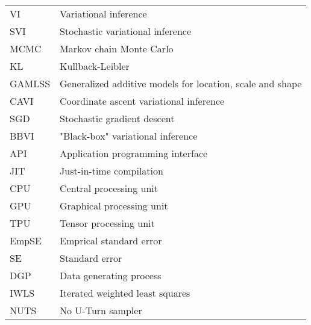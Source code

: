 \begin{tabular}{@{} l @{\hskip 1in} l}
  VI & Variational inference \\
  SVI & Stochastic variational inference \\
  MCMC & Markov chain Monte Carlo \\
  KL & Kullback-Leibler \\
  GAMLSS & Generalized additive models for location, scale and shape \\
  CAVI & Coordinate ascent variational inference \\
  SGD & Stochastic gradient descent \\
  BBVI & "Black-box" variational inference \\
  API & Application programming interface \\
  JIT & Just-in-time compilation \\
  CPU & Central processing unit \\
  GPU & Graphical processing unit \\
  TPU & Tensor processing unit \\
  EmpSE & Emprical standard error \\
  SE & Standard error \\
  DGP & Data generating process \\
  IWLS & Iterated weighted least squares \\
  NUTS & No U-Turn sampler \\
\end{tabular}

